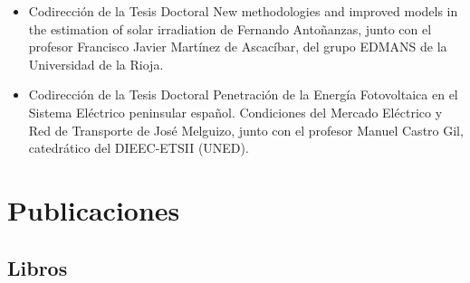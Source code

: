 \documentclass[article, a4paper]{memoir}
\begin{document}
\begin{itemize}
\item Codirección de la Tesis Doctoral \guillemotleft{}New methodologies and improved
models in the estimation of solar irradiation\guillemotright{} de Fernando
Antoñanzas, junto con el profesor Francisco Javier Martínez de
Ascacíbar, del grupo EDMANS de la Universidad de la Rioja.

\item Codirección de la Tesis Doctoral \guillemotleft{}Penetración de la Energía
Fotovoltaica en el Sistema Eléctrico peninsular español. Condiciones
del Mercado Eléctrico y Red de Transporte\guillemotright{} de José Melguizo, junto
con el profesor Manuel Castro Gil, catedrático del DIEEC-ETSII
(UNED).
\end{itemize}


\section{Publicaciones}
\label{sec-5}

\subsection{Libros}
\label{sec-5-1}
\end{document}

